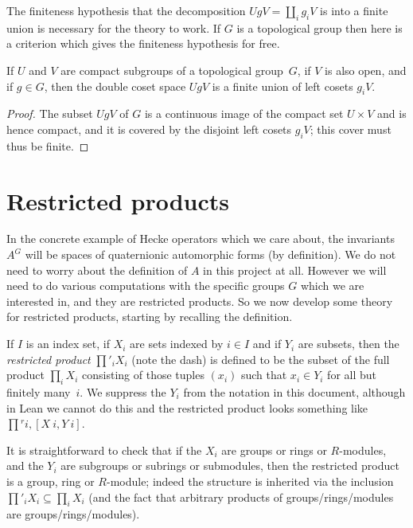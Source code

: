 The finiteness hypothesis that the decomposition $UgV=\coprod_i g_iV$ is
into a finite union is necessary for the theory to work. If $G$ is a topological
group then here is a criterion which gives the finiteness hypothesis for free.

\begin{lemma}
  \label{QuotientGroup.mk_image_finite_of_compact_of_open}
  \leanok
  If $U$ and $V$ are compact subgroups of a topological group~$G$,
  if $V$ is also open, and if $g\in G$, then the double coset space $UgV$
  is a finite union of left cosets $g_iV$.
\end{lemma}
\begin{proof}
  \leanok
  The subset $UgV$ of $G$ is a continuous image of the compact set $U\times V$
  and is hence compact, and it is covered by the disjoint left cosets $g_iV$;
  this cover must thus be finite.
\end{proof}

\section{Restricted products}

In the concrete example of Hecke operators which we care about, the invariants $A^G$
will be spaces of quaternionic automorphic
forms (by definition). We do not need to worry about the definition of $A$ in this
project at all. However we will need to do various computations with the
specific groups $G$ which we are interested in, and they are restricted products.
So we now develop some theory for restricted products,
starting by recalling the definition.

If $I$ is an index set, if $X_i$ are sets indexed by $i\in I$ and if $Y_i$
are subsets, then the \emph{restricted product} $\prod'_iX_i$ (note the dash) is defined
to be the subset of the full product $\prod_i X_i$ consisting of those
tuples $(x_i)$ such that $x_i\in Y_i$ for all but finitely many~$i$. We suppress
the $Y_i$ from the notation in this document, although in Lean we cannot do this and
the restricted product looks something like $\prod{}^{r} i,[X\ i, Y\ i]$.

It is straightforward to check that if the $X_i$ are groups or rings or $R$-modules,
and the $Y_i$ are subgroups or subrings or submodules, then the restricted product
is a group, ring or $R$-module; indeed the structure is inherited via the
inclusion $\prod'_iX_i\subseteq\prod_iX_i$ (and the fact that arbitrary products
of groups/rings/modules are groups/rings/modules).

